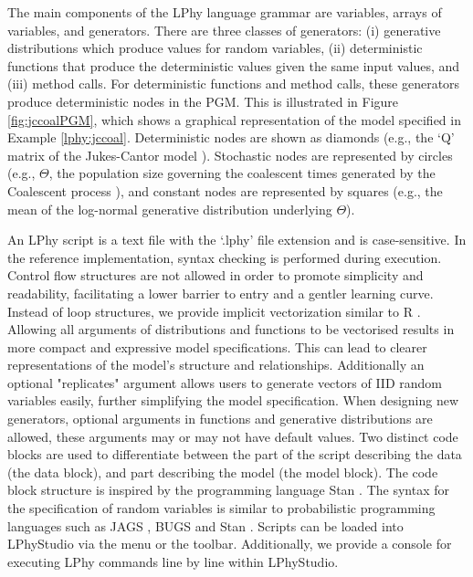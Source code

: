 \documentclass[10pt,letterpaper,table]{article}
\theoremstyle{definition}
\begin{document}
The main components of the LPhy language grammar are variables, arrays of variables, and generators. 
There are three classes of generators: (i) generative distributions which produce values for random variables, (ii) deterministic functions that produce the deterministic values given the same input values, and (iii) method calls.
For deterministic functions and method calls, these generators produce deterministic nodes in the PGM.
This is illustrated in Figure \ref{fig:jccoalPGM}, which shows a graphical representation of the model specified in Example \ref{lphy:jccoal}.
Deterministic nodes are shown as diamonds (e.g., the `Q' matrix of the Jukes-Cantor model \cite{jc69}).
Stochastic nodes are represented by circles (e.g., $\Theta$, the population size governing the coalescent times generated by the Coalescent process \cite{kingman82}), and constant nodes are represented by squares (e.g., the mean of the log-normal generative distribution underlying $\Theta$). 

An LPhy script is a text file with the `.lphy' file extension and is case-sensitive. 
In the reference implementation, syntax checking is performed during execution. 
Control flow structures are not allowed in order to promote simplicity and readability, facilitating a lower barrier to entry and a gentler learning curve. 
Instead of loop structures, we provide implicit vectorization similar to R \cite{ihaka1996r}. Allowing all arguments of distributions and functions to be vectorised results in more compact and expressive model specifications. This can lead to clearer representations of the model's structure and relationships. Additionally an optional "replicates" argument allows users to generate vectors of IID random variables easily, further simplifying the model specification.
When designing new generators, optional arguments in functions and generative distributions are allowed, these arguments may or may not have default values. 
Two distinct code blocks are used to differentiate between the part of the script describing the data (the data block), and part describing the model (the model block). 
The code block structure is inspired by the programming language Stan \cite{carpenter2017stan}. 
The syntax for the specification of random variables is similar to probabilistic programming languages such as JAGS \cite{plummer2004jags}, BUGS \cite{lunn2009bugs, gilks1994language} and Stan \cite{carpenter2017stan}.
Scripts can be loaded into LPhyStudio via the menu or the toolbar. 
Additionally, we provide a console for executing LPhy commands line by line within LPhyStudio. 
\end{document}
